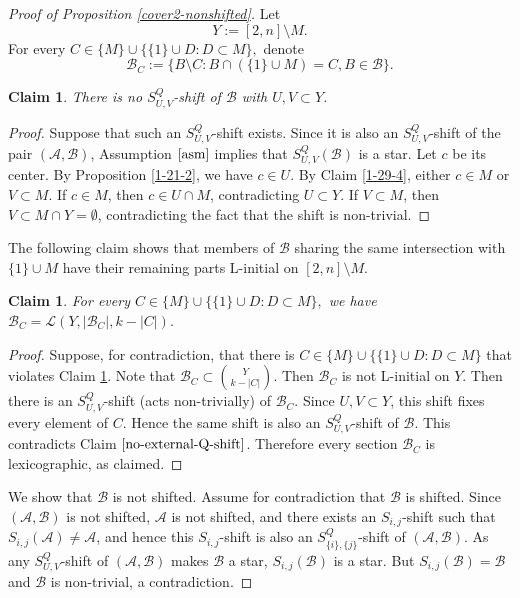 \documentclass[a4paper,11pt]{article}
\newtheorem{claim}[theorem]{Claim}
\newcommand{\m}{\mathcal}
\begin{document}
\begin{proof}[Proof of Proposition \ref{cover2-nonshifted}]
Let
\[
Y:=[2,n]\setminus M.
\]
For every
$C\in \{M\}\cup\{\{1\}\cup D:D\subset M\},$ denote
\[
\m B_C:=\{B\setminus C: B\cap (\{1\}\cup M)=C, B\in \m B\}.
\]


\begin{claim}\label{no-external-Q-shift}
There is no $S^Q_{U,V}$-shift of $\mathcal B$ with
$U,V\subset Y$.
\end{claim}

\begin{proof}
Suppose that such an $S^Q_{U,V}$-shift exists. Since it is also an
$S^Q_{U,V}$-shift of the pair $(\mathcal A,\mathcal B)$, Assumption
$\ref{asm}$ implies that $S^Q_{U,V}(\mathcal B)$ is a star. Let $c$
be its center. By Proposition \ref{1-21-2}, we have $c\in U$. By
Claim \ref{1-29-4}, either $c\in M$ or $V\subset M$.
If $c\in M$, then $c\in U\cap M$, contradicting $U\subset Y$. If
$V\subset M$, then $V\subset M\cap Y=\emptyset$, contradicting the
fact that the shift is non-trivial.
\end{proof}

The following claim shows that members of $\m B$ sharing the same intersection with $\{1\}\cup M$ have their remaining parts L-initial on $[2,n]\setminus M$.
\begin{claim}\label{B-sections-lex}
For every
$C\in \{M\}\cup\{\{1\}\cup D:D\subset M\},$
we have
$\mathcal B_C=\mathcal L(Y,|\mathcal B_C|,k-|C|).$
\end{claim}

\begin{proof}
Suppose, for contradiction, that there is $C\in \{M\}\cup\{\{1\}\cup D:D\subset M\}$ that violates Claim \ref{B-sections-lex}. 
Note that $\m B_C \subset {Y\choose k-|C|}$. 
Then $\mathcal B_C$ is not L-initial on $Y$. Then there is an $S_{U,V}^Q$-shift (acts non-trivially) of $\mathcal B_C$.
Since $U,V\subset Y$, this shift fixes every element of $C$. Hence the 
same shift is also an $S_{U,V}^Q$-shift of $\mathcal B$. 
This contradicts Claim $\ref{no-external-Q-shift}$. Therefore every section $\mathcal B_C$ is lexicographic, as claimed.
\end{proof}

We show that $\m B$ is not shifted. Assume for contradiction that $\m B$ is shifted. 
Since $(\mathcal A,\mathcal B)$ is not shifted, $\m A$ is not shifted, and there exists an $S_{i,j}$-shift such that $S_{i,j}(\m A) \ne \m A$, and hence this $S_{i,j}$-shift is also an $S_{\{i\},\{j\}}^Q$-shift of $(\m A, \m B)$.  
As any $S_{U,V}^Q$-shift of $(\m A, \m B)$ makes $\m B$ a star, $S_{i,j}(\m B)$ is a star.
But $S_{i,j}(\m B)=\m B$ and $\m B$ is non-trivial, a contradiction. 


\end{proof}
\end{document}
